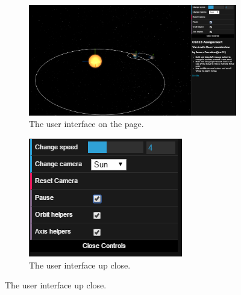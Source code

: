 \documentclass[12pt]{article}
\begin{document}
\begin{figure}[H]
        \centering
        \begin{subfigure}[b]{0.4\textwidth}
                \includegraphics[width=\textwidth]{images/userinterface}
                \caption{The user interface on the page.}
                \label{fig: The user interface.}
	 \end{subfigure}
        \begin{subfigure}[b]{0.4\textwidth}
                \includegraphics[width=\textwidth]{images/closeupui}
                \caption{The user interface up close.}
                \label{fig: Close up of the user interface.}
	 \end{subfigure}
\end{figure}
\end{document}
